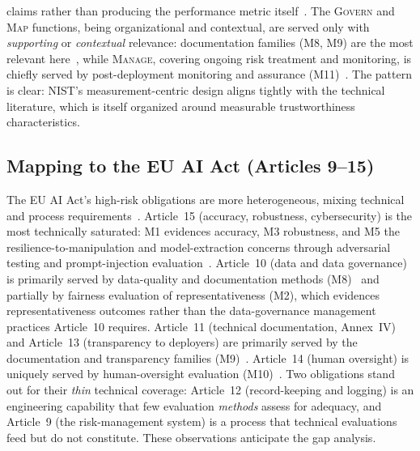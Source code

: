 claims rather than producing the performance metric itself~\cite{guo2017calibration}. The
\textsc{Govern} and \textsc{Map} functions, being organizational and contextual, are served
only with \emph{supporting} or \emph{contextual} relevance: documentation families (M8, M9)
are the most relevant here~\cite{mitchell2019modelcards,gebru2018datasheets},
while \textsc{Manage}, covering ongoing risk treatment and monitoring, is chiefly served by
post-deployment monitoring and assurance (M11)~\cite{leest2025contextaware}. The pattern
is clear: NIST's measurement-centric design aligns tightly with the technical literature,
which is itself organized around measurable trustworthiness characteristics.

\subsection{Mapping to the EU AI Act (Articles 9--15)}\label{sec:map-eu}
The EU AI Act's high-risk obligations are more heterogeneous, mixing technical and
process requirements~\cite{euaiact2024}. Article~15 (accuracy, robustness, cybersecurity)
is the most technically saturated: M1 evidences accuracy, M3 robustness, and M5 the
resilience-to-manipulation and model-extraction concerns through adversarial testing and
prompt-injection
evaluation~\cite{dong2023promptrobust,greshake2023notwhat,zhang2024agent}. Article~10
(data and data governance) is primarily served by data-quality and documentation
methods (M8)~\cite{gebru2018datasheets,luccioni2023dataprovenance} and partially by
fairness evaluation of representativeness (M2), which evidences representativeness
outcomes rather than the data-governance management practices Article~10 requires. Article~11 (technical documentation, Annex~IV) and
Article~13 (transparency to deployers) are primarily served by the documentation and
transparency families (M9)~\cite{mitchell2019modelcards,pan2024modelreporting}. Article~14
(human oversight) is uniquely served by human-oversight evaluation
(M10)~\cite{guo2024reliance,chen2024reliancedrills}. Two obligations stand out for their
\emph{thin} technical coverage: Article~12 (record-keeping and logging) is an engineering
capability that few evaluation \emph{methods} assess for adequacy, and Article~9 (the
risk-management system) is a process that technical evaluations feed but do not
constitute. These observations anticipate the gap analysis.

